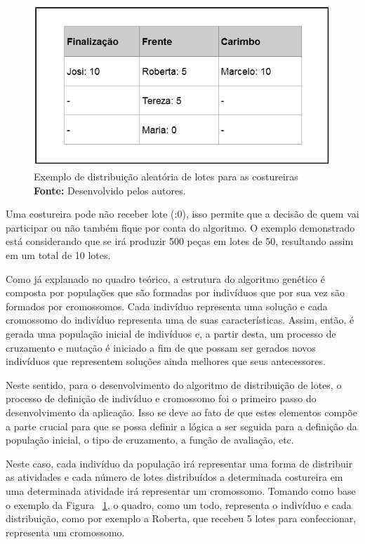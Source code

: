\begin{figure}[h!]
	\centerline{\includegraphics[scale=0.6]{./imagens/distribuicao_exemplo.png}}
	\caption[Exemplo de distribuição aleatória de lotes para as costureiras]
	{Exemplo de distribuição aleatória de lotes para as costureiras \textbf{Fonte:}
	Desenvolvido pelos autores.}
	\label{fig:distribuicao_lotes_costureiras}
\end{figure}

\par Uma costureira pode não receber lote (:0), isso permite que a decisão de
quem vai participar ou não também fique por conta do algoritmo. O exemplo demonstrado está considerando que se irá produzir 500 peças em lotes de 50, 
resultando assim em um total de 10 lotes.

\par Como já explanado no quadro teórico, a estrutura do algoritmo genético é composta
por populações que são formadas por indivíduos que por sua vez são formados por cromossomos.
Cada indivíduo representa uma solução e cada cromossomo do indivíduo representa uma de suas características. 
Assim, então, é gerada uma população inicial de indivíduos e, a partir desta, um
processo de cruzamento e mutação é iniciado a fim de que possam ser gerados
novos indivíduos que representem soluções ainda melhores que seus antecessores.

\par Neste sentido, para o desenvolvimento do algoritmo de distribuição de
lotes, o processo de definição de indivíduo e cromossomo foi o primeiro passo do desenvolvimento da aplicação. Isso se
deve ao fato de que estes elementos compõe a parte crucial para que se
possa definir a lógica a ser seguida para a definição da população inicial, o
tipo de cruzamento, a função de avaliação, etc.

\par Neste caso, cada indivíduo da população irá representar uma forma de
distribuir as atividades e cada número de lotes distribuídos a determinada
costureira em uma determinada atividade irá representar um cromossomo. 
Tomando como base o exemplo da Figura ~\ref{fig:distribuicao_lotes_costureiras},
o quadro, como um todo, representa o indivíduo e cada distribuição, como por exemplo a Roberta, que recebeu 5 
lotes para confeccionar, representa um cromossomo.

